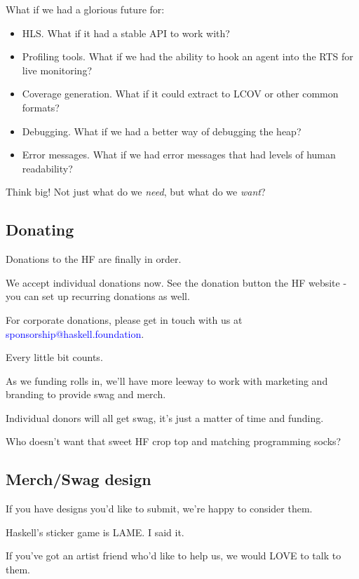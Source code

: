 \documentclass[tikz]{beamer}
\newcommand{\blue}[1]{\textcolor{blue}{#1}}
\theoremstyle{definition}
\begin{document}
\frame
{ 
	What if we had a glorious future for: 
	
	\begin{itemize}
		\item HLS. What if it had a stable API to work with? 
		\item Profiling tools. What if we had the ability to hook an agent into the RTS for live monitoring? 
		\item Coverage generation. What if it could extract to LCOV or other common formats?
		\item Debugging. What if we had a better way of debugging the heap? 
		\item Error messages. What if we had error messages that had levels of human readability?
	\end{itemize}
} 

\frame
{ 
	Think big! Not just what do we \textit{need}, but what do we \textit{want}?
} 

\subsection{Donating}

\frame
{ 
	Donations to the HF are finally in order. 
} 

\frame
{ 
	We accept individual donations now. See the donation button the HF website - you can set up recurring donations as well. 
} 

\frame
{ 
	For corporate donations, please get in touch with us at \blue{sponsorship@haskell.foundation}. 
} 

\frame
{ 
	Every little bit counts. 
} 

\frame
{ 
	As we funding rolls in, we'll have more leeway to work with marketing and branding to provide swag and merch. 
} 

\frame
{ 
	Individual donors will all get swag, it's just a matter of time and funding. 
} 

\frame
{ 
	Who doesn't want that sweet HF crop top and matching programming socks? 
} 

\subsection{Merch/Swag design}
\frame
{ 
	If you have designs you'd like to submit, we're happy to consider them.
} 

\frame
{ 
	Haskell's sticker game is LAME. I said it. 
} 

\frame
{ 
	If you've got an artist friend who'd like to help us, we would LOVE to talk to them. 
} 
\end{document}
